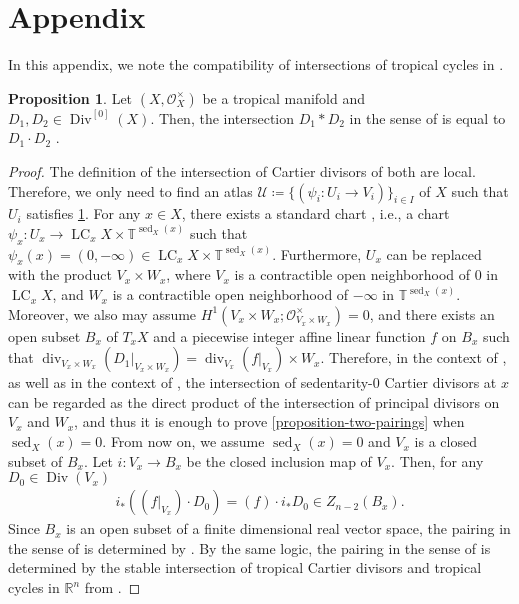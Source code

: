 \documentclass[a4paper,dvipdfmx,reqno,12pt]{amsart}
\theoremstyle{definition}
\newtheorem{proposition}[theorem]{Proposition}
\newcommand{\deq}{\coloneqq}
\newcommand{\opn}[1]{\operatorname{#1}}
\numberwithin{equation}{section}
\begin{document}
\section{Appendix}
In this appendix, we note the compatibility of
intersections of tropical cycles in
\cite{MR4637248,demedrano2023chern,shaw2015tropical}.
\begin{proposition}
\label{proposition-two-intersection}
Let $(X,\mathcal{O}_X^{\times})$ be a tropical manifold
and $D_1,D_2\in \opn{Div}^{[0]}(X)$. Then,
the intersection $D_1*D_2$ in the sense of
\cite[]{demedrano2023chern} is equal
to $D_1\cdot D_2$ \cite[]{MR4637248}.
\end{proposition}
\begin{proof}
\label{proposition-two-pairings}
The definition of
the intersection of Cartier divisors
of both are local.
Therefore, we only need to find an atlas
$\mathcal{U}\deq \{(\psi_i:U_i\to V_i)\}_{i\in I}$
of $X$
such that $U_i$ satisfies
\cref{proposition-two-intersection}.
For any $x\in X$, there exists
a standard chart \cite[Definition 7.2.10]{mikhalkin2018tropical},
i.e., a chart $ \psi_x
\colon U_x \to 
\opn{LC}_x X\times \mathbb{T}^{\opn{sed}_X(x)}$
such that $\psi_x(x)=(0,-\infty)\in
\opn{LC}_x X\times \mathbb{T}^{\opn{sed}_X(x)}$.
Furthermore, $U_x$ can be replaced with the product 
$V_x \times W_x$,
where $V_x$ is a contractible open neighborhood of $0$
in $\opn{LC}_x X$,
and $W_x$ is a contractible open neighborhood of
$-\infty$ in $\mathbb{T}^{\opn{sed}_X(x)}$.
Moreover, we also may assume 
$H^{1}(V_x\times W_x;\mathcal{O}_{V_x\times W_x}^{\times})=0$,
and there exists an open subset $B_x$ of $T_x X$ and
a piecewise integer affine linear function $f$
on $B_x$ such that 
$\opn{div}_{V_x\times W_x}(D_1|_{V_x\times W_x})=\opn{div}_{V_x}(f|_{V_x})\times W_x$.
Therefore, in the context of
\cite{MR4637248}, as well as in the context of
\cite{demedrano2023chern}, the intersection
of sedentarity-0 Cartier divisors at $x$  
can be regarded as the direct product of
the intersection of principal divisors on 
$V_x$ and $W_x$, and thus
it is enough to prove \cref{proposition-two-pairings}
when $\opn{sed}_X(x)=0$. From now on, we assume
$\opn{sed}_X(x)=0$ and $V_x$ is a closed subset of
$B_x$. Let $i \colon V_x\to B_x$ be the closed inclusion
map of $V_x$. Then, for any $D_0\in \opn{Div}(V_x)$ 
\begin{align}
i_*((f|_{V_x})\cdot D_0)=(f)\cdot i_*D_0
\in Z_{n-2}(B_x).
\end{align}
Since $B_x$ is an open subset of a finite dimensional
real vector space, the pairing in the sense of 
\cite[]{MR4637248} is
determined by \cite[Definition 3.4]{MR2591823}.
By the same logic, the pairing in the sense
of \cite[]{demedrano2023chern}
is determined by the stable intersection of
tropical Cartier divisors and tropical cycles
in $\mathbb{R}^{n}$ \cite[Definition 4.4]{MR2275625}
from \cite[Proposition 2.1.9]{shaw2011tropical}.


\end{proof}
\end{document}
